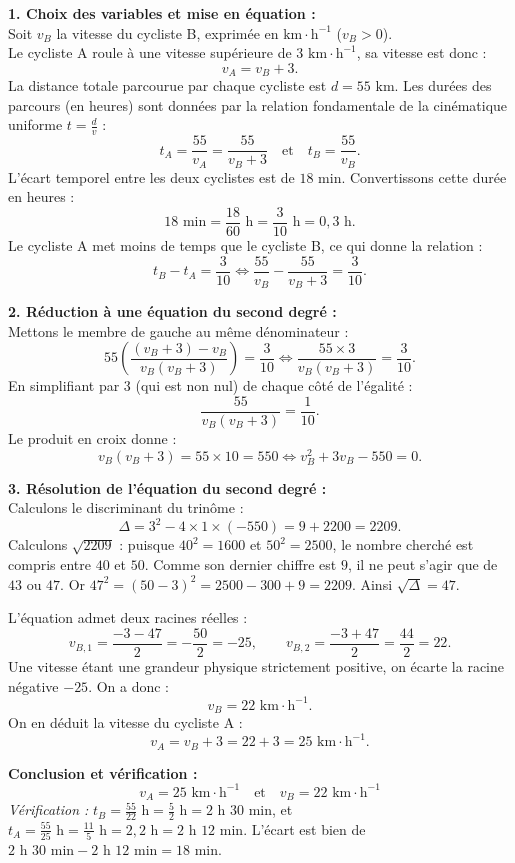 \documentclass[11pt,a4paper]{article}
\begin{document}
\begin{correctionbox}
\textbf{1. Choix des variables et mise en équation :}\\
Soit $v_B$ la vitesse du cycliste B, exprimée en $\text{km}\cdot\text{h}^{-1}$ ($v_B > 0$).\\
Le cycliste A roule à une vitesse supérieure de $3\text{ km}\cdot\text{h}^{-1}$, sa vitesse est donc :
\[
v_A = v_B + 3.
\]
La distance totale parcourue par chaque cycliste est $d = 55\text{ km}$.
Les durées des parcours (en heures) sont données par la relation fondamentale de la cinématique uniforme $t = \frac{d}{v}$ :
\[
t_A = \frac{55}{v_A} = \frac{55}{v_B + 3} \quad \text{et} \quad t_B = \frac{55}{v_B}.
\]
L'écart temporel entre les deux cyclistes est de $18\text{ min}$. Convertissons cette durée en heures :
\[
18\text{ min} = \frac{18}{60}\text{ h} = \frac{3}{10}\text{ h} = 0{,}3\text{ h}.
\]
Le cycliste A met moins de temps que le cycliste B, ce qui donne la relation :
\[
t_B - t_A = \frac{3}{10} \iff \frac{55}{v_B} - \frac{55}{v_B + 3} = \frac{3}{10}.
\]

\textbf{2. Réduction à une équation du second degré :}\\
Mettons le membre de gauche au même dénominateur :
\[
55 \left( \frac{(v_B + 3) - v_B}{v_B(v_B + 3)} \right) = \frac{3}{10} \iff \frac{55 \times 3}{v_B(v_B + 3)} = \frac{3}{10}.
\]
En simplifiant par $3$ (qui est non nul) de chaque côté de l'égalité :
\[
\frac{55}{v_B(v_B + 3)} = \frac{1}{10}.
\]
Le produit en croix donne :
\[
v_B(v_B + 3) = 55 \times 10 = 550 \iff v_B^2 + 3v_B - 550 = 0.
\]

\textbf{3. Résolution de l'équation du second degré :}\\
Calculons le discriminant du trinôme :
\[
\Delta = 3^2 - 4 \times 1 \times (-550) = 9 + 2200 = 2209.
\]
Calculons $\sqrt{2209}$ : puisque $40^2 = 1600$ et $50^2 = 2500$, le nombre cherché est compris entre $40$ et $50$. Comme son dernier chiffre est $9$, il ne peut s'agir que de $43$ ou $47$.
Or $47^2 = (50 - 3)^2 = 2500 - 300 + 9 = 2209$. Ainsi $\sqrt{\Delta} = 47$.

L'équation admet deux racines réelles :
\[
v_{B,1} = \frac{-3 - 47}{2} = -\frac{50}{2} = -25, \qquad v_{B,2} = \frac{-3 + 47}{2} = \frac{44}{2} = 22.
\]
Une vitesse étant une grandeur physique strictement positive, on écarte la racine négative $-25$. On a donc :
\[
v_B = 22\text{ km}\cdot\text{h}^{-1}.
\]
On en déduit la vitesse du cycliste A :
\[
v_A = v_B + 3 = 22 + 3 = 25\text{ km}\cdot\text{h}^{-1}.
\]

\textbf{Conclusion et vérification :}\\
\[
\boxed{v_A = 25\text{ km}\cdot\text{h}^{-1} \quad \text{et} \quad v_B = 22\text{ km}\cdot\text{h}^{-1}}
\]
\textit{Vérification :}
$t_B = \frac{55}{22}\text{ h} = \frac{5}{2}\text{ h} = 2\text{ h } 30\text{ min}$, et $t_A = \frac{55}{25}\text{ h} = \frac{11}{5}\text{ h} = 2{,}2\text{ h} = 2\text{ h } 12\text{ min}$.
L'écart est bien de $2\text{ h } 30\text{ min} - 2\text{ h } 12\text{ min} = 18\text{ min}$.
\end{correctionbox}
\end{document}
